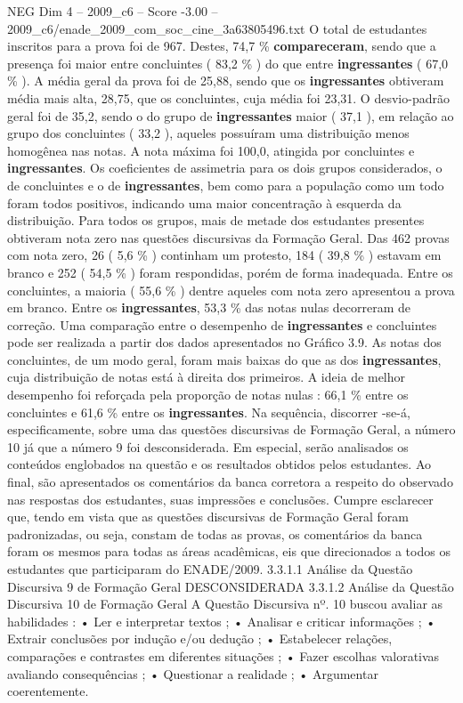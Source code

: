 \begin{textsample}{NEG Dim 4 – 2009\_c6 – Score -3.00 – 2009\_c6/enade\_2009\_com\_soc\_cine\_3a63805496.txt}
O total de estudantes inscritos para a prova foi de 967.
Destes, 74,7 \% \textbf{compareceram}, sendo que a presença foi maior entre concluintes ( 83,2 \% ) do que entre \textbf{ingressantes} ( 67,0 \% ).
A média geral da prova foi de 25,88, sendo que os \textbf{ingressantes} obtiveram média mais alta, 28,75, que os concluintes, cuja média foi 23,31.
O desvio-padrão geral foi de 35,2, sendo o do grupo de \textbf{ingressantes} maior ( 37,1 ), em relação ao grupo dos concluintes ( 33,2 ), aqueles possuíram uma distribuição menos homogênea nas notas.
A nota máxima foi 100,0, atingida por concluintes e \textbf{ingressantes}.
Os coeficientes de assimetria para os dois grupos considerados, o de concluintes e o de \textbf{ingressantes}, bem como para a população como um todo foram todos positivos, indicando uma maior concentração à esquerda da distribuição.
Para todos os grupos, mais de metade dos estudantes presentes obtiveram nota zero nas questões discursivas da Formação Geral.
Das 462 provas com nota zero, 26 ( 5,6 \% ) continham um protesto, 184 ( 39,8 \% ) estavam em branco e 252 ( 54,5 \% ) foram respondidas, porém de forma inadequada.
Entre os concluintes, a maioria ( 55,6 \% ) dentre aqueles com nota zero apresentou a prova em branco.
Entre os \textbf{ingressantes}, 53,3 \% das notas nulas decorreram de correção.
Uma comparação entre o desempenho de \textbf{ingressantes} e concluintes pode ser realizada a partir dos dados apresentados no Gráfico 3.9.
As notas dos concluintes, de um modo geral, foram mais baixas do que as dos \textbf{ingressantes}, cuja distribuição de notas está à direita dos primeiros.
A ideia de melhor desempenho foi reforçada pela proporção de notas nulas : 66,1 \% entre os concluintes e 61,6 \% entre os \textbf{ingressantes}.
Na sequência, discorrer -se-á, especificamente, sobre uma das questões discursivas de Formação Geral, a número 10 já que a número 9 foi desconsiderada.
Em especial, serão analisados os conteúdos englobados na questão e os resultados obtidos pelos estudantes.
Ao final, são apresentados os comentários da banca corretora a respeito do observado nas respostas dos estudantes, suas impressões e conclusões.
Cumpre esclarecer que, tendo em vista que as questões discursivas de Formação Geral foram padronizadas, ou seja, constam de todas as provas, os comentários da banca foram os mesmos para todas as áreas acadêmicas, eis que direcionados a todos os estudantes que participaram do ENADE/2009. 3.3.1.1 Análise da Questão Discursiva 9 de Formação Geral DESCONSIDERADA 3.3.1.2 Análise da Questão Discursiva 10 de Formação Geral A Questão Discursiva nº. 10 buscou avaliar as habilidades : • Ler e interpretar textos ; • Analisar e criticar informações ; • Extrair conclusões por indução e/ou dedução ; • Estabelecer relações, comparações e contrastes em diferentes situações ; • Fazer escolhas valorativas avaliando consequências ; • Questionar a realidade ; • Argumentar coerentemente.

\end{textsample}
